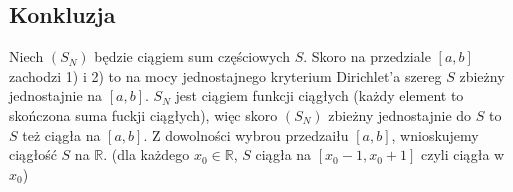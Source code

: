 \documentclass{article}
\begin{document}
\subsection*{Konkluzja}
Niech $(S_N)$ będzie ciągiem sum częściowych $S$.
Skoro na przedziale $[a, b]$ zachodzi 1) i 2) to na mocy jednostajnego kryterium Dirichlet'a szereg $S$ zbieżny jednostajnie na $[a, b]$. \newline 
$S_N$ jest ciągiem funkcji ciągłych (każdy element to skończona suma fuckji ciągłych), więc skoro 
$(S_N)$ zbieżny jednostajnie do $S$ to $S$ też ciągła na $[a, b]$. \newline
Z dowolności wybrou przedzaiłu $[a, b]$, wnioskujemy ciągłość $S$ na $\mathbb{R}$. (dla każdego $x_0 \in \mathbb{R}$, $S$ ciągła na $[x_0-1, x_0+1]$ czyli ciągła w $x_0$)
\end{document}
